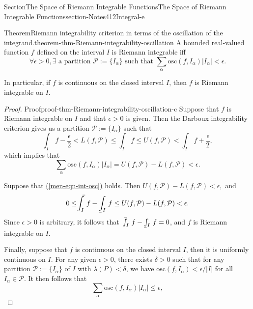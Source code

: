 \documentclass[oneside,10pt,]{article}
\makeatletter
\newcommand{\xreffont}{\relax}
\numberwithin{equation}{section}
\newcommand{\cP}{\mathcal{P}}
\newcommand{\osc}{\text{osc}}
\def\upint{\mathchoice
    {\mkern10mu\overline{\vphantom{\intop}\mkern7mu}\mkern-24mu}
    {\mkern7mu\overline{\vphantom{\intop}\mkern7mu}\mkern-14mu}
    {\mkern7mu\overline{\vphantom{\intop}\mkern7mu}\mkern-14mu}
    {\mkern7mu\overline{\vphantom{\intop}\mkern7mu}\mkern-14mu}
  \int}
\def\lowint{\relax\if@display
 \mkern3mu\underline{\vphantom{\intop}\mkern7mu}\mkern-10mu\int
\else 
\underline{\vphantom{\int}\mkern7mu}\mkern-10mu\int
\fi}
\makeatother
\begin{document}
\begin{sectionptx}{Section}{The Space of Riemann Integrable Functions}{}{The Space of Riemann Integrable Functions}{}{}{section-Notes412Integral-e}
\begin{theorem}{Theorem}{Riemann integrability criterion in terms of the oscillation of the integrand.}{}{theorem-thm-Riemann-integrability-oscillation}%
A bounded real-valued function \(f\) defined on the interval \(I\) is Riemann integrable iff%
\begin{equation}
\forall \epsilon >0, \exists  \text{ a partition }
\cP:=\{I_{\alpha}\} \text{ such that } 
\sum_{\alpha} \osc(f,I_{\alpha})\vert I_{\alpha} \vert < \epsilon.\label{men-eqn-int-osc}
\end{equation}
%
\par
In particular, if \(f\) is continuous on the closed interval \(I\), then \(f\) is Riemann integrable on \(I\).%
\end{theorem}
\begin{proof}{Proof}{}{proof-thm-Riemann-integrability-oscillation-c}
Suppose that \(f\) is Riemann integrable on \(I\) and that \(\epsilon>0\) is given. Then the Darboux integrability criterion gives us a partition \(\cP:=\{I_{\alpha}\}\) such that%
\begin{equation*}
\int_{I}\, f -\frac{\epsilon}{2} < L(f, \cP)\le \int_{I}\, f \le 
U (f, \cP)  < \int_{I}\, f  + \frac{\epsilon}{2},
\end{equation*}
which implies that%
\begin{equation*}
\sum_{\alpha} \osc(f,I_{\alpha})\vert I_{\alpha} \vert
=U (f, \cP)-L (f, \cP) < \epsilon.
\end{equation*}
%
\par
Suppose that \hyperref[men-eqn-int-osc]{({\xreffont\ref{men-eqn-int-osc}})} holds. Then \(U (f, \cP)-L (f, \cP) < \epsilon,\)  and%
\begin{equation*}
0\le \upint_{I}\, f  -\lowint_{I} \, f  \le U (f, \cP)-L (f, \cP) < \epsilon.
\end{equation*}
Since \(\epsilon >0\) is arbitrary, it follows that \(\upint_{I}\, f -\lowint_{I} \, f=0\),  and \(f\) is Riemann integrable on \(I\).%
\par
Finally, suppose that \(f\) is continuous on the closed interval \(I\), then it is uniformly continuous on \(I\). For any given \(\epsilon >0\), there exists \(\delta >0\) such that for any partition \(\cP:=\{I_{\alpha}\}\) of \(I\) with \(\lambda (P) < \delta\), we have \(\osc(f, I_{\alpha}) < \epsilon/\vert I\vert\) for all \(I_{\alpha} \in \cP\). It then follows that%
\begin{equation*}
\sum_{\alpha} \osc(f,I_{\alpha})\vert I_{\alpha} \vert \le \epsilon,
\end{equation*}

\end{proof}
\end{sectionptx}
\end{document}
